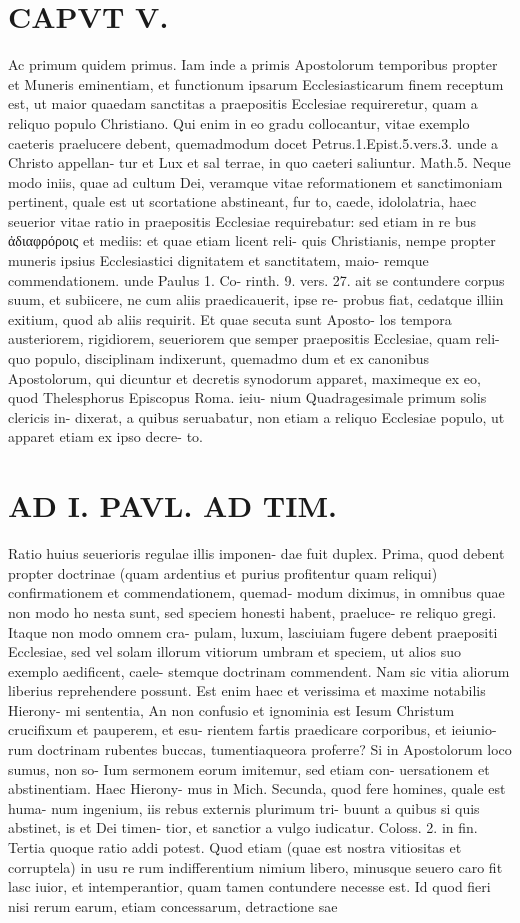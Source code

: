 \documentclass{article}
\begin{document}
\begin{pages}
\section*{CAPVT V. }
\marginpar{[ p.37 ]}Ac primum quidem primus. Iam inde a primis Apostolorum temporibus propter et Muneris eminentiam, et functionum ipsarum Ecclesiasticarum finem receptum est, ut maior quaedam sanctitas a praepositis Ecclesiae requireretur, quam a reliquo populo Christiano. Qui enim in eo gradu collocantur, vitae exemplo caeteris praelucere debent, quemadmodum docet Petrus.1.Epist.5.vers.3. unde a Christo appellan- tur et Lux et sal terrae, in quo caeteri saliuntur. Math.5. Neque modo iniis, quae ad cultum Dei, veramque vitae reformationem et sanctimoniam pertinent, quale est ut scortatione abstineant, fur to, caede, idololatria, haec seuerior vitae ratio in praepositis Ecclesiae requirebatur: sed etiam in re bus ἀδιαφρόροις et mediis: et quae etiam licent reli- quis Christianis, nempe propter muneris ipsius Ecclesiastici dignitatem et sanctitatem, maio- remque commendationem. unde Paulus 1. Co- rinth. 9. vers. 27. ait se contundere corpus suum, et subiicere, ne cum aliis praedicauerit, ipse re- probus fiat, cedatque illiin exitium, quod ab aliis requirit. Et quae secuta sunt Aposto- los tempora austeriorem, rigidiorem, seueriorem que semper praepositis Ecclesiae, quam reli- quo populo, disciplinam indixerunt, quemadmo dum et ex canonibus Apostolorum, qui dicuntur et decretis synodorum apparet, maximeque ex eo, quod Thelesphorus Episcopus Roma. ieiu- nium Quadragesimale primum solis clericis in- dixerat, a quibus seruabatur, non etiam a reliquo Ecclesiae populo, ut apparet etiam ex ipso decre- to. 
\section*{AD I. PAVL. AD TIM. }
\marginpar{[ p.372 ]}Ratio huius seuerioris regulae illis imponen- dae fuit duplex. Prima, quod debent propter doctrinae (quam ardentius et purius profitentur quam reliqui) confirmationem et commendationem, quemad- modum diximus, in omnibus quae non modo ho nesta sunt, sed speciem honesti habent, praeluce- re reliquo gregi. Itaque non modo omnem cra- pulam, luxum, lasciuiam fugere debent praepositi Ecclesiae, sed vel solam illorum vitiorum umbram et speciem, ut alios suo exemplo aedificent, caele- stemque doctrinam commendent. Nam sic vitia aliorum liberius reprehendere possunt. Est enim haec et verissima et maxime notabilis Hierony- mi sententia, An non confusio et ignominia est Iesum Christum crucifixum et pauperem, et esu- rientem fartis praedicare corporibus, et ieiunio- rum doctrinam rubentes buccas, tumentiaqueora proferre? Si in Apostolorum loco sumus, non so- Ium sermonem eorum imitemur, sed etiam con- uersationem et abstinentiam. Haec Hierony- mus in Mich. Secunda, quod fere homines, quale est huma- num ingenium, iis rebus externis plurimum tri- buunt a quibus si quis abstinet, is et Dei timen- tior, et sanctior a vulgo iudicatur. Coloss. 2. in fin. Tertia quoque ratio addi potest. Quod etiam (quae est nostra vitiositas et corruptela) in usu re rum indifferentium nimium libero, minusque seuero caro fit lasc iuior, et intemperantior, quam tamen contundere necesse est. Id quod fieri nisi rerum earum, etiam concessarum, detractione sae 

\end{pages}
\end{document}
